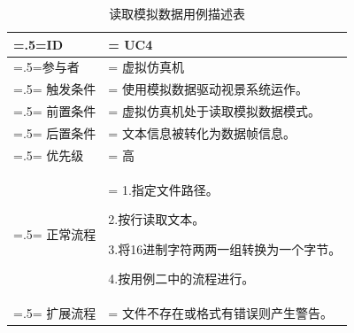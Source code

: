\begin{table}[htbp]
    \begin{center}
        \caption{读取模拟数据用例描述表}
        \label{usecase4}
        \renewcommand\arraystretch{1.5}
        \begin{tabularx}{0.8\textwidth}{ 
            | >{\centering\arraybackslash\hsize=.5\hsize\linewidth=\hsize}X 
            | >{\raggedright\arraybackslash\hsize=1.5\hsize\linewidth=\hsize}X 
            | }
            \hline
            \textbf{ID} & \textbf{UC4}\\
            \hline
            参与者 & 虚拟仿真机\\
            \hline
            触发条件 & 使用模拟数据驱动视景系统运作。\\
            \hline
            前置条件 & 虚拟仿真机处于读取模拟数据模式。\\
            \hline
            后置条件 & 文本信息被转化为数据帧信息。\\
            \hline
            优先级 & 高\\
            \hline
            正常流程 & 1.指定文件路径。\par 2.按行读取文本。\par 3.将16进制字符两两一组转换为一个字节。\par 4.按用例二中的流程进行。\\
            \hline
            扩展流程 & 文件不存在或格式有错误则产生警告。\\
            \hline
        \end{tabularx}
    \end{center}
\end{table}

